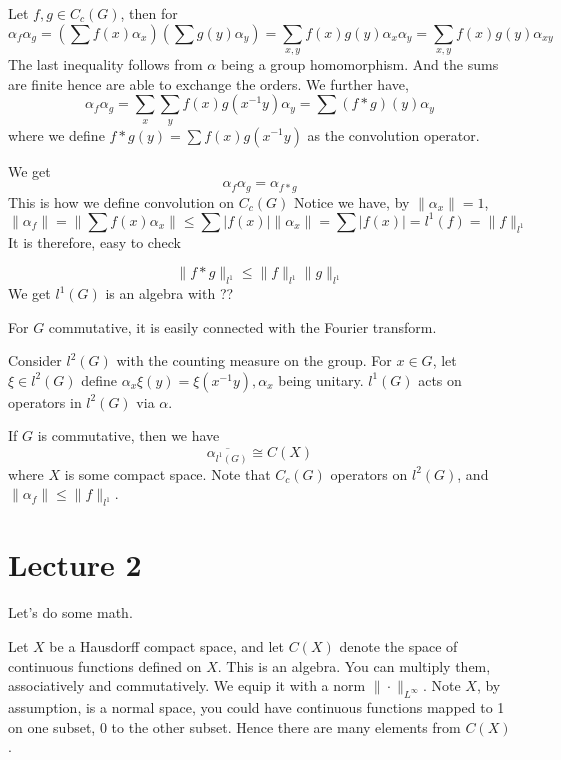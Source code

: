 Let $f,g\in C_c(G)$, then for 
\begin{equation*}
    \alpha_f\alpha_g=(\sum f(x)\alpha_x)(\sum g(y)\alpha_y)=\sum_{x,y}f(x)g(y)\alpha_x\alpha_y=\sum_{x,y}f(x)g(y)\alpha_{xy}
\end{equation*}
The last inequality follows from $\alpha$ being a group homomorphism. And the sums are finite hence are able to exchange the orders.
We further have,
\begin{equation*}
    \alpha_f\alpha_g=\sum_x\sum_yf(x)g(x^{-1}y)\alpha_y=\sum (f\ast g)(y)\alpha_y
\end{equation*}
where we define $f\ast g(y)=\sum f(x)g(x^{-1}y)$ as the convolution operator.


We get
\begin{equation*}
    \alpha_f\alpha_g=\alpha_{f\ast g}
\end{equation*}
This is how we define convolution on $C_c(G)$
Notice we have, by $\|\alpha_x\|=1$,
\begin{equation*}
    \|\alpha_f\|=\|\sum f(x)\alpha_x\|\leq\sum|f(x)|\|\alpha_x\|=\sum|f(x)|=l^1(f)=\|f\|_{l^1}
\end{equation*}
It is therefore, easy to check

\begin{equation*}
    \|f\ast g\|_{l^1}\leq\|f\|_{l^1}\|g\|_{l^1}
\end{equation*}
We get $l^1(G)$ is an algebra with ??

For $G$ commutative, it is easily connected with the Fourier transform.

Consider $l^2(G)$ with the counting measure on the group. For $x\in G$, let $\xi\in l^2(G)$ define $\alpha_x\xi(y)=\xi(x^{-1}y), \alpha_x$ being unitary.
$l^1(G)$ acts on operators in $l^2(G)$ via $\alpha$.


If $G$ is commutative, then we have
\begin{equation*}
    \overline{\alpha_{l^1(G)}}\cong C(X)
\end{equation*}
where $X$ is some compact space.
Note that $C_c(G)$ operators on $l^2(G)$, and $\|\alpha_f\|\leq\|f\|_{l^1}$.

\newpage
\section{Lecture 2}
Let's do some math.

Let $X$ be a Hausdorff compact space, and let $C(X)$ denote the space of continuous functions defined on $X$. This is an algebra. You can multiply them, associatively and commutatively. We equip it with a norm $\|\cdot\|_{L^\infty}$. Note $X$, by assumption, is a normal space, you could have continuous functions mapped to 1 on one subset, 0 to the other subset. Hence there are many elements from $C(X)$.

